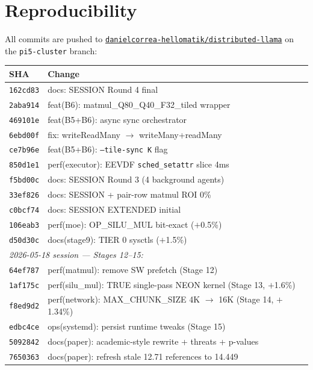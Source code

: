 \documentclass[10pt,a4paper]{article}
\begin{document}
\section{Reproducibility}

All commits are pushed to \href{https://github.com/danielcorrea-hellomatik/distributed-llama}{\texttt{danielcorrea-hellomatik/distributed-llama}} on the \texttt{pi5-cluster} branch:

\begin{table}[H]
\centering
\footnotesize
\begin{tabular}{ll}
\toprule
\textbf{SHA} & \textbf{Change} \\
\midrule
\texttt{162cd83} & docs: SESSION Round 4 final \\
\texttt{2aba914} & feat(B6): matmul\_Q80\_Q40\_F32\_tiled wrapper \\
\texttt{469101e} & feat(B5+B6): async sync orchestrator \\
\texttt{6ebd00f} & fix: writeReadMany $\to$ writeMany+readMany \\
\texttt{ce7b96e} & feat(B5+B6): \texttt{--tile-sync K} flag \\
\texttt{850d1e1} & perf(executor): EEVDF \texttt{sched\_setattr} slice 4ms \\
\texttt{f5bd00c} & docs: SESSION Round 3 (4 background agents) \\
\texttt{33ef826} & docs: SESSION + pair-row matmul ROI 0\% \\
\texttt{c0bcf74} & docs: SESSION EXTENDED initial \\
\texttt{106eab3} & perf(moe): OP\_SILU\_MUL bit-exact ($+$0.5\%) \\
\texttt{d50d30c} & docs(stage9): TIER 0 sysctls ($+$1.5\%) \\
\midrule
\multicolumn{2}{l}{\emph{2026-05-18 session --- Stages 12--15:}} \\
\texttt{64ef787} & perf(matmul): remove SW prefetch (Stage 12) \\
\texttt{1af175c} & perf(silu\_mul): TRUE single-pass NEON kernel (Stage 13, $+$1.6\%) \\
\texttt{f8ed9d2} & perf(network): MAX\_CHUNK\_SIZE 4K $\to$ 16K (Stage 14, $+$1.34\%) \\
\texttt{edbc4ce} & ops(systemd): persist runtime tweaks (Stage 15) \\
\texttt{5092842} & docs(paper): academic-style rewrite + threats + p-values \\
\texttt{7650363} & docs(paper): refresh stale 12.71 references to 14.449 \\
\bottomrule
\end{tabular}
\end{table}
\end{document}
